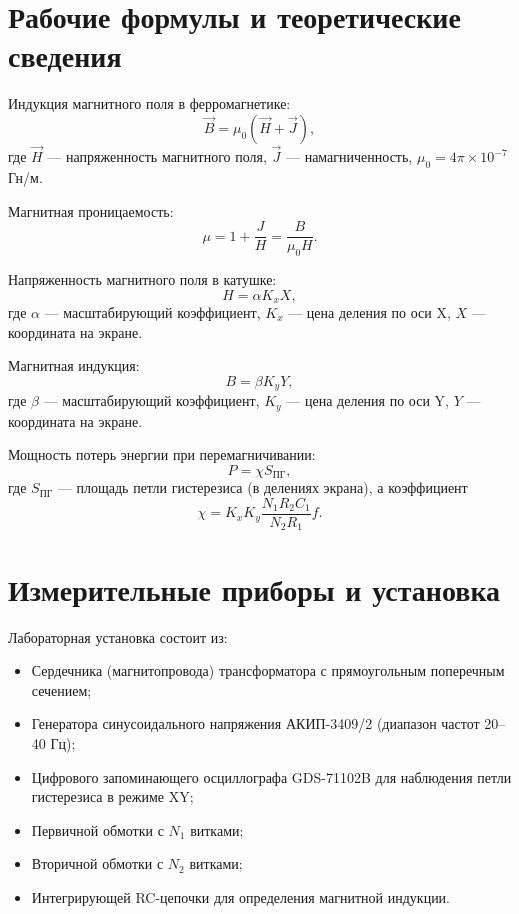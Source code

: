 \documentclass[a4paper,14pt]{article}
\begin{document}
\section{Рабочие формулы и теоретические сведения}

Индукция магнитного поля в ферромагнетике:
\begin{equation}
    \vec{B} = \mu_0(\vec{H} + \vec{J}),
    \label{eq:induction}
\end{equation}
где $\vec{H}$ — напряженность магнитного поля, $\vec{J}$ — намагниченность, $\mu_0 = 4\pi \times 10^{-7}$\,Гн/м.

Магнитная проницаемость:
\begin{equation}
    \mu = 1 + \frac{J}{H} = \frac{B}{\mu_0 H}.
    \label{eq:permeability}
\end{equation}

Напряженность магнитного поля в катушке:
\begin{equation}
    H = \alpha K_x X,
    \label{eq:H}
\end{equation}
где $\alpha$ — масштабирующий коэффициент, $K_x$ — цена деления по оси X, $X$ — координата на экране.

Магнитная индукция:
\begin{equation}
    B = \beta K_y Y,
    \label{eq:B}
\end{equation}
где $\beta$ — масштабирующий коэффициент, $K_y$ — цена деления по оси Y, $Y$ — координата на экране.

Мощность потерь энергии при перемагничивании:
\begin{equation}
    P = \chi S_{\text{ПГ}},
    \label{eq:power}
\end{equation}
где $S_{\text{ПГ}}$ — площадь петли гистерезиса (в делениях экрана), а коэффициент
\begin{equation}
    \chi = K_xK_y\frac{N_1R_2C_1}{N_2R_1}f.
    \label{eq:chi}
\end{equation}

\section{Измерительные приборы и установка}

Лабораторная установка состоит из:
\begin{itemize}
    \item Сердечника (магнитопровода) трансформатора с прямоугольным поперечным сечением;
    \item Генератора синусоидального напряжения АКИП-3409/2 (диапазон частот 20--40 Гц);
    \item Цифрового запоминающего осциллографа GDS-71102B для наблюдения петли гистерезиса в режиме XY;
    \item Первичной обмотки с $N_1$ витками;
    \item Вторичной обмотки с $N_2$ витками;
    \item Интегрирующей RC-цепочки для определения магнитной индукции.
\end{itemize}
\end{document}
